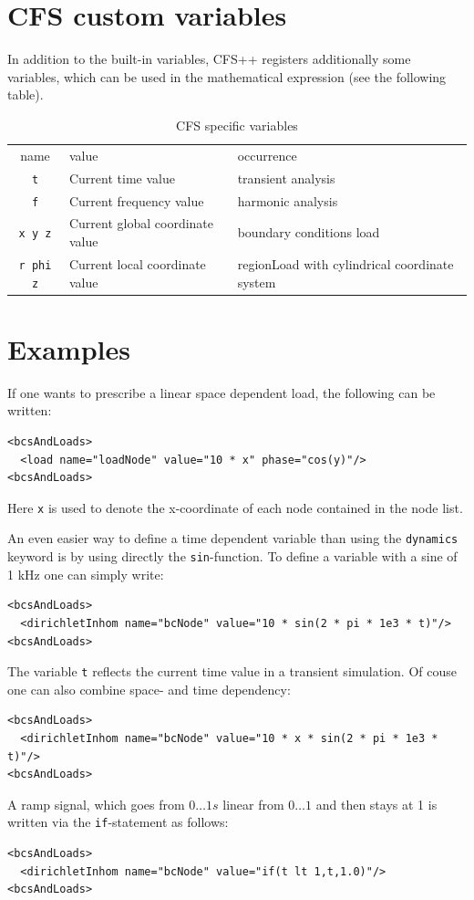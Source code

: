 \section{CFS custom variables}
In addition to the built-in variables, CFS++ registers additionally
some variables, which can be used in the mathematical expression (see
the following table).
\begin{table}[ht]
  \begin{longtable}{c|p{}|p{}}
    \hline\noalign{\smallskip}
     name & value & occurrence \\
    \noalign{\smallskip}\hline\noalign{\smallskip}
    \verb#t#     & Current time value       & transient analysis \\
    \verb#f#     & Current frequency value  & harmonic analysis \\
    \verb$x y z$ & Current global coordinate value & boundary
    conditions \newline load \\
    \verb#r phi z# & Current local coordinate value & regionLoad
    with cylindrical coordinate system
  \end{longtable}
  \caption{CFS specific variables}
 \end{table}

\section{Examples}
If one wants to prescribe a linear space dependent load, the following can be
written:
\begin{verbatim}
<bcsAndLoads>
  <load name="loadNode" value="10 * x" phase="cos(y)"/>
<bcsAndLoads>
\end{verbatim}
Here \verb#x# is used to denote the x-coordinate of each node
contained in the node list.
\newline

\noindent
An even easier way to define a time dependent variable than using the
\verb#dynamics# keyword is by using directly the
\verb#sin#-function. To define a variable with a sine of 1 kHz one can
simply write:
\begin{verbatim}
<bcsAndLoads>
  <dirichletInhom name="bcNode" value="10 * sin(2 * pi * 1e3 * t)"/>
<bcsAndLoads>
\end{verbatim}
The variable \verb#t# reflects the current time value in a transient
simulation.
Of couse one can also combine space- and time dependency:
\begin{verbatim}
<bcsAndLoads>
  <dirichletInhom name="bcNode" value="10 * x * sin(2 * pi * 1e3 * t)"/>
<bcsAndLoads>
\end{verbatim}
A ramp signal, which goes from $0 \ldots 1 s$ linear from $0 \ldots 1$ and then stays at 1 is written via the \verb#if#-statement as follows:
\begin{verbatim}
<bcsAndLoads>
  <dirichletInhom name="bcNode" value="if(t lt 1,t,1.0)"/>
<bcsAndLoads>
\end{verbatim}

